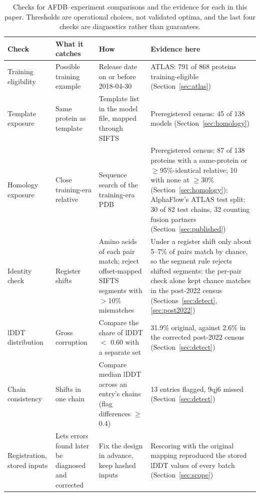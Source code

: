 \documentclass{article}
\begin{document}
\begin{table}[t]
\centering
\caption{Checks for AFDB--experiment comparisons and the evidence for each in this paper. Thresholds are operational choices, not validated optima, and the last four checks are diagnostics rather than guarantees.}
\label{tab:checks}
\small
\newcommand{\rc}{\raggedright}
\begin{tabular}{@{}p{2.8cm}p{2.9cm}p{4.0cm}p{5.5cm}@{}}
\toprule
Check & What it catches & How & Evidence here \\
\midrule
\rc Training eligibility & \rc Possible training example & \rc Release date on or before 2018-04-30 & \rc ATLAS: 791 of 868 proteins training-eligible (Section~\ref{sec:atlas}) \tabularnewline
\rc Template exposure & \rc Same protein as template & \rc Template list in the model file, mapped through SIFTS & \rc Preregistered census: 45 of 138 models (Section~\ref{sec:homology}) \tabularnewline
\rc Homology exposure & \rc Close training-era relative & \rc Sequence search of the training-era PDB & \rc Preregistered census: 87 of 138 proteins with a same-protein or $\ge$95\%-identical relative; 10 with none at $\ge$30\% (Section~\ref{sec:homology}); AlphaFlow's ATLAS test split: 30 of 82 test chains, 32 counting fusion partners (Section~\ref{sec:published}) \tabularnewline
\rc Identity check & \rc Register shifts & \rc Amino acids of each pair match; reject offset-mapped SIFTS segments with $>$10\% mismatches & \rc Under a register shift only about 5--7\% of pairs match by chance, so the segment rule rejects shifted segments; the per-pair check alone kept chance matches in the post-2022 census (Sections~\ref{sec:detect}, \ref{sec:post2022}) \tabularnewline
\rc lDDT distribution & \rc Gross corruption & \rc Compare the share of lDDT $<$ 0.60 with a separate set & \rc 31.9\% original, against 2.6\% in the corrected post-2022 census (Section~\ref{sec:detect}) \tabularnewline
\rc Chain consistency & \rc Shifts in one chain & \rc Compare median lDDT across an entry's chains (flag differences $\ge$0.4) & \rc 13 entries flagged, 9qj6 missed (Section~\ref{sec:detect}) \tabularnewline
\rc Registration, stored inputs & \rc Lets errors found later be diagnosed and corrected & \rc Fix the design in advance, keep hashed inputs & \rc Rescoring with the original mapping reproduced the stored lDDT values of every batch (Section~\ref{sec:scope}) \tabularnewline
\bottomrule
\end{tabular}
\end{table}
\end{document}
